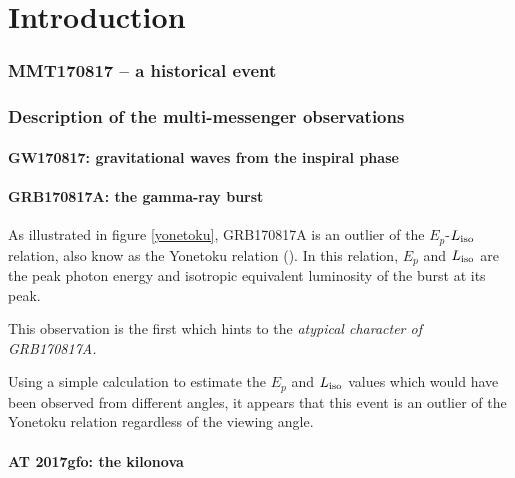 \part{Introduction}

\section{MMT170817 -- a historical event}

\section{Description of the multi-messenger observations}

\subsection{GW170817: gravitational waves from the inspiral phase}

\subsection{GRB170817A: the gamma-ray burst}

As illustrated in figure \ref{yonetoku}, GRB170817A is an outlier of the $E_p$-$L_{\rm{iso}}$ relation, also know as the Yonetoku relation (\cite{35}). In this relation, $E_p$  and $L_{\rm{iso}}$ are the peak photon energy and isotropic equivalent luminosity of the burst at its peak.

This observation is the first which hints to the \it{atypical} character of GRB170817A.


Using a simple calculation to estimate the $E_p$ and $L_{\rm{iso}}$ values which would have been observed from different angles, it appears that this event is an outlier of the Yonetoku relation regardless of the viewing angle.

\subsection{AT 2017gfo: the kilonova}

